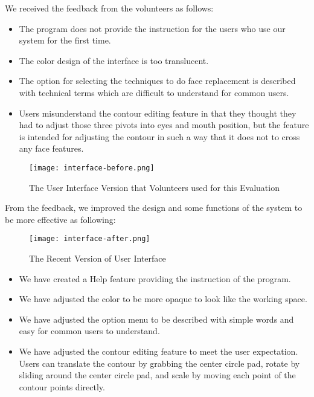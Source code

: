 \vspace{0.2in}\noindent We received the feedback from the volunteers as follows:

\begin{itemize}
\item The program does not provide the instruction for the users who use our system for the first time.
\item The color design of the interface is too translucent.
\item The option for selecting the techniques to do face replacement is described with technical terms which are difficult to understand for common users.
\item Users misunderstand the contour editing feature in that they thought they had to adjust those three pivots into eyes and mouth position, but the feature is intended for adjusting the contour in such a way that it does not to cross any face features.
\end{itemize}

\begin{figure}[htb]
   \centering
   \texttt{[image: interface-before.png]}
   \caption{The User Interface Version that Volunteers used for this Evaluation}
   \label{fig:InterfaceBefore}
\end{figure}

\noindent From the feedback, we improved the design and some functions of the system to be more effective as following:

\begin{figure}[htb]
   \centering
   \texttt{[image: interface-after.png]}
   \caption{The Recent Version of User Interface}
   \label{fig:InterfaceAfter}
\end{figure}

\begin{itemize}
\item We have created a Help feature providing the instruction of the program.
\item We have adjusted the color to be more opaque to look like the working space.
\item We have adjusted the option menu to be described with simple words and easy for common users to understand.
\item We have adjusted the contour editing feature to meet the user expectation. Users can translate the contour by grabbing the center circle pad, rotate by sliding around the center circle pad, and scale by moving each point of the contour points directly.
\end{itemize}


